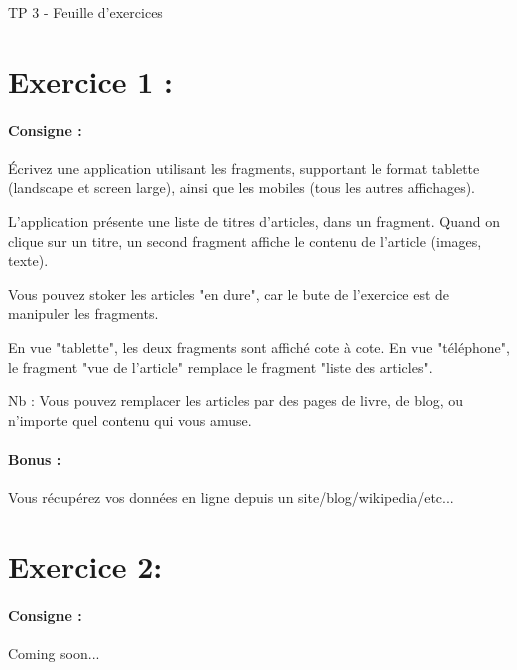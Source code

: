 \documentclass{article}
\begin{document}
\begin{center}
\large\sc TP 3 - Feuille d'exercices
\end{center}

\section{Exercice 1 :} 

\paragraph{Consigne : } Écrivez une application utilisant les fragments, supportant le format tablette (landscape et screen large), ainsi que les mobiles (tous les autres affichages).

L'application présente une liste de titres d'articles, dans un fragment. Quand on clique sur un titre, un second fragment affiche le contenu de l'article (images, texte).

Vous pouvez stoker les articles "en dure", car le bute de l'exercice est de manipuler les fragments.

En vue "tablette", les deux fragments sont affiché cote à cote.
En vue "téléphone", le fragment "vue de l'article" remplace le fragment "liste des articles".

Nb : Vous pouvez remplacer les articles par des pages de livre, de blog, ou n'importe quel contenu qui vous amuse.

\paragraph{Bonus :} Vous récupérez vos données en ligne depuis un site/blog/wikipedia/etc...


\section{Exercice 2:}
\paragraph{Consigne :} Coming soon...
\end{document}
